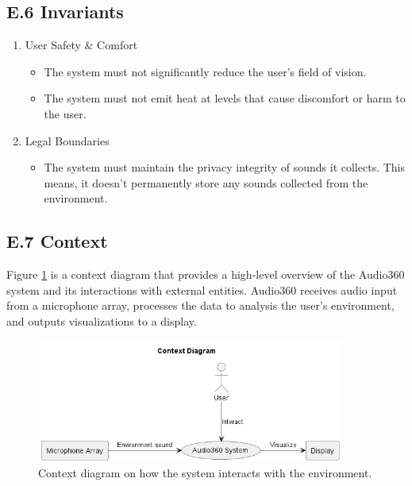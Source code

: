 \documentclass[12pt]{article}
\theoremstyle{definition}
\begin{document}
\subsection{E.6 Invariants}

\begin{enumerate}
  \item User Safety \& Comfort
  \begin{itemize}
    \item The system must not significantly reduce the user's field of vision. 
    \item The system must not emit heat at levels that cause discomfort or harm
    to the user. 
  \end{itemize}

  \item Legal Boundaries
  \begin{itemize}
    \item The system must maintain the privacy integrity of sounds it collects.
    This means, it doesn't permanently store any sounds collected from the
    environment. 
  \end{itemize}
\end{enumerate}

\subsection{E.7 Context}

Figure \ref{fig:system_context_diagram} is a context diagram that provides a
high-level overview of the Audio360 system and its interactions with external
entities. Audio360 receives audio input from a microphone array, processes the
data to analysis the user's environment, and outputs visualizations to a
display.

\begin{figure}[H]     
    \centering 
    \includegraphics[width=0.9\textwidth]{diagrams/context_diagram.png}
    \caption{Context diagram on how the system interacts with the environment.}
    \label{fig:system_context_diagram}
\end{figure}
\end{document}
